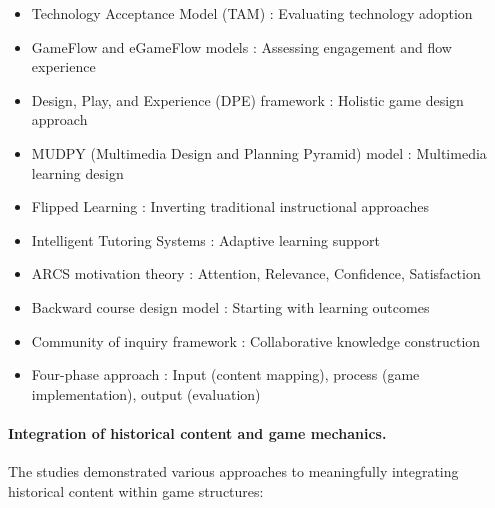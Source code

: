 \documentclass[a4paper,fleqn]{cas-sc}
\begin{document}
\begin{enumerate}[noitemsep]
\begin{itemize}[noitemsep]
 \item Technology Acceptance Model (TAM) \citep{24Ghannem2019, 44Shiue2016, 45Yu2016727, 59Kee2014270}: Evaluating technology adoption
 
 \item GameFlow and eGameFlow models \citep{32Cheng20241718, 39Tegos2014838, 67Lin201296}: Assessing engagement and flow experience
 
 \item Design, Play, and Experience (DPE) framework \citep{5kazanidis2018alpha}: Holistic game design approach
 
 \item MUDPY (Multimedia Design and Planning Pyramid) model \citep{80gottlieb2018your}: Multimedia learning design
 
 \item Flipped Learning \citep{17Manzanares2019}: Inverting traditional instructional approaches
 
 \item Intelligent Tutoring Systems \citep{17Manzanares2019}: Adaptive learning support
 
 \item ARCS motivation theory \citep{28Chao201734, 66Rahmawati2023163}: Attention, Relevance, Confidence, Satisfaction
 
 \item Backward course design model \citep{42Huffer201581}: Starting with learning outcomes
 
 \item Community of inquiry framework \citep{42Huffer201581}: Collaborative knowledge construction
 
 \item Four-phase approach \citep{69Wong2017150}: Input (content mapping), process (game implementation), output (evaluation)
\end{itemize}
\end{enumerate}


\paragraph{Integration of historical content and game mechanics.}

The studies demonstrated various approaches to meaningfully integrating historical content within game structures:
\end{document}
